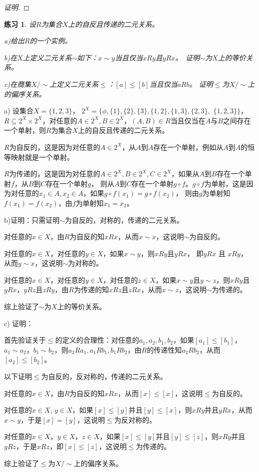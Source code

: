 \documentclass{book}[oneside]
\newtheorem{Exercise}{练习}[chapter]
\begin{document}
\begin{CJK*}{UTF8}{gbsn}
\begin{proof}[证明]
\end{proof}
\begin{Exercise}
  设$R$为集合$X$上的自反且传递的二元关系。

a)给出$R$的一个实例。

b)在$X$上定义二元关系$\sim$如下：$x\sim y$当且仅当$x R y$且$y R x$。　证明$\sim$为$X$上的等价关系。

c)在商集$X/\sim$上定义二元关系$\leq$：$[a]\leq [b]$当且仅当$aRb$。
证明$\leq$为$X/\sim$上的偏序关系。  
\end{Exercise}
 a) 设集合$X=\{1,2,3\}$，
$2^X=\{\phi,\{1\},\{2\},\{3\},\{1,2\},\{1,3\},\{2,3\},$ $\{1,2,3\}\}$，
$R\subseteq 2^X\times 2^X$，对任意的$A\in 2^X,B\in 2^X$，$(A,B)\in R$当且仅当在$A$与$B$之间存在一个单射，则$R$为集合$X$上的自反且传递的二元关系。

$R$为自反的，这是因为对任意的$A\in 2^X$，从$A$到$A$存在一个单射，例如从$A$到$A$的恒等映射就是一个单射。

$R$为传递的，这是因为对任意的$A\in 2^X, B\in 2^X, C\in 2^X$，如果从$A$到$B$存在一个单射$f$，从$B$到$C$存在一个单射$g$，
则从$A$到$C$存在一个单射$g\circ f$。$g\circ f$为单射，这是因为对任意的$x_1\in A,x_2\in A$，如果$g\circ f(x_1)=g\circ f(x_2)$，
则由$g$为单射知$f(x_1)=f(x_2)$，由$f$为单射知$x_1=x_2$。

b)证明：只需证明$\sim$为自反的，对称的，传递的二元关系。

  对任意的$x\in X$，由$R$为自反的知$xRx$，从而$x\sim x$，这说明$\sim$为自反的。

  对任意的$x\in X$，对任意的$y\in X$，如果$x\sim y$，则$xRy$且$yRx$， 
  即$yRx$ 且 $xRy$， 从而$y\sim x$，这说明$\sim$为对称的。

  对任意的$x\in X$，对任意的$y\in X$，对任意的$z\in X$，如果$x\sim y$且$y\sim z$，则$xRy$且$yRx$，$yRz$且$zRy$，由$R$为传递的知$xRz$且$zRx$，从而$x\sim z$，这说明$\sim$为传递的。

  综上验证了$\sim$为$X$上的等价关系。

  c) 证明：

首先验证关于$\leq$的定义的合理性：对任意的$a_1,a_2,b_1,b_2$，如果$[a_1]\leq [b_1]$，
$a_1\sim a_2$，$b_1\sim b_2$，则$a_2 R a_1, a_1 R b_1, b_1 R b_2$，由$R$的传递性知$a_2 R b_2$，从而$[a_2]\leq [b_2]$。

以下证明$\leq$为自反的，反对称的，传递的二元关系。

  对任意的$x\in X$，由$R$为自反的知$xRx$，从而$[x]\leq [x]$，这说明$\leq$为自反的。

  对任意的$x\in X$, $y\in X$，如果$[x]\leq [y]$并且$[y]\leq [x]$，则$xRy$并且$yRx$，从而$x\sim y$，于是$[x]=[y]$，这说明$\leq$为反对称的。

  对任意的$x\in X$，$y\in X$，$z\in X$，如果$[x] \leq [y]$并且$[y] \leq [z]$，则$xRy$并且$yRz$，于是$xRz$，即$[x]\leq [z]$，这说明$\leq$为传递的。

  综上验证了$\leq$为$X/\sim$上的偏序关系。

 

      \chapter{}

\end{CJK*}
\end{document}
